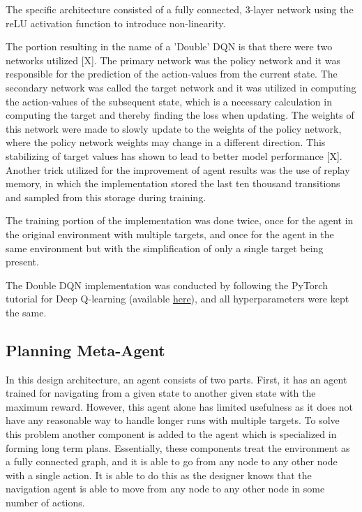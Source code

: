 \documentclass{article}
\begin{document}
        The specific architecture consisted of a fully connected, 3-layer network using the reLU activation function to introduce non-linearity.

        The portion resulting in the name of a 'Double' DQN is that there were two networks utilized [X]. The primary network was the policy network and it was responsible for the prediction of the action-values from the current state. The secondary network was called the target network and it was utilized in computing the action-values of the subsequent state, which is a necessary calculation in computing the target and thereby finding the loss when updating. The weights of this network were made to slowly update to the weights of the policy network, where the policy network weights may change in a different direction. This stabilizing of target values has shown to lead to better model performance [X]. Another trick utilized for the improvement of agent results was the use of replay memory, in which the implementation stored the last ten thousand transitions and sampled from this storage during training.

        The training portion of the implementation was done twice, once for the agent in the original environment with multiple targets, and once for the agent in the same environment but with the simplification of only a single target being present.

        The Double DQN implementation was conducted by following the PyTorch tutorial for Deep Q-learning (available \href{https://pytorch.org/tutorials/intermediate/reinforcement_q_learning.html}{here}), and all hyperparameters were kept the same.

    \subsection{Planning Meta-Agent}
    \label{planning}
    In this design architecture, an agent consists of two parts. First, it has an agent trained for navigating from a given state to another given state with the maximum reward. However, this agent alone has limited usefulness as it does not have any reasonable way to handle longer runs with multiple targets. To solve this problem another component is added to the agent which is specialized in forming long term plans. Essentially, these components treat the environment as a fully connected graph, and it is able to go from any node to any other node with a single action. It is able to do this as the designer knows that the navigation agent is able to move from any node to any other node in some number of actions.
    
\end{document}
